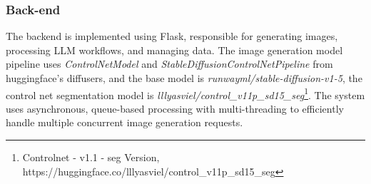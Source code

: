




\subsubsection{Back-end}

The backend is implemented using Flask, responsible for generating images, processing LLM workflows, and managing data. 
The image generation model pipeline uses \textit{ControlNetModel} and \textit{StableDiffusionControlNetPipeline} from huggingface's diffusers\cite{von-platen-etal-2022-diffusers}, and the base model is \textit{runwayml/stable-diffusion-v1-5}, the control net segmentation model is \textit{lllyasviel/control\_v11p\_sd15\_seg}\footnote{Controlnet - v1.1 - seg Version, https://huggingface.co/lllyasviel/control\_v11p\_sd15\_seg}. The system uses asynchronous, queue-based processing with multi-threading to efficiently handle multiple concurrent image generation requests. 

